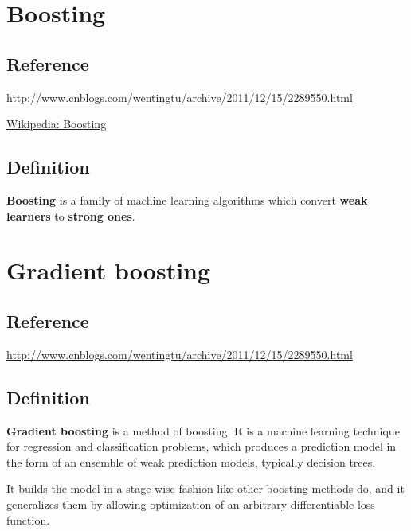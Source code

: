 \section { Boosting }

\subsection { Reference }

\href {http://www.cnblogs.com/wentingtu/archive/2011/12/15/2289550.html} {http://www.cnblogs.com/wentingtu/archive/2011/12/15/2289550.html}

\href {https://en.wikipedia.org/wiki/Boosting_(machine_learning)} { Wikipedia: Boosting }


\subsection { Definition }

\textbf{Boosting} is a family of machine learning algorithms which convert
\textbf{weak learners} to \textbf{strong ones}.



\section { Gradient boosting }

\subsection { Reference }

\href {http://www.cnblogs.com/wentingtu/archive/2011/12/15/2289550.html} {http://www.cnblogs.com/wentingtu/archive/2011/12/15/2289550.html}



\subsection { Definition }

\textbf { Gradient boosting } is a method of boosting. It is a machine learning
technique for regression and classification problems, which produces a
prediction model in the form of an ensemble of weak prediction models, typically
decision trees.

It builds the model in a stage-wise fashion like other boosting methods do, and
it generalizes them by allowing optimization of an arbitrary differentiable loss
function.
